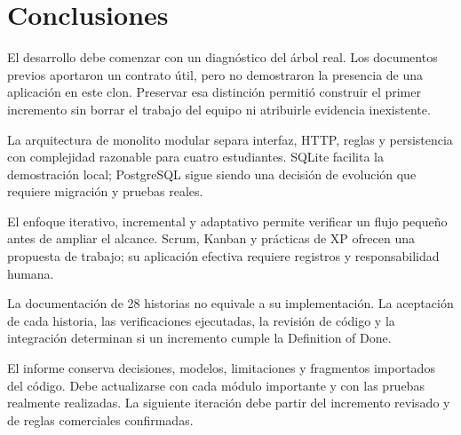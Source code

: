 \chapter{Conclusiones}
El desarrollo debe comenzar con un diagnóstico del árbol real. Los documentos previos aportaron un contrato útil, pero no demostraron la presencia de una aplicación en este clon. Preservar esa distinción permitió construir el primer incremento sin borrar el trabajo del equipo ni atribuirle evidencia inexistente.

La arquitectura de monolito modular separa interfaz, HTTP, reglas y persistencia con complejidad razonable para cuatro estudiantes. SQLite facilita la demostración local; PostgreSQL sigue siendo una decisión de evolución que requiere migración y pruebas reales.

El enfoque iterativo, incremental y adaptativo permite verificar un flujo pequeño antes de ampliar el alcance. Scrum, Kanban y prácticas de XP ofrecen una propuesta de trabajo; su aplicación efectiva requiere registros y responsabilidad humana.

La documentación de 28 historias no equivale a su implementación. La aceptación de cada historia, las verificaciones ejecutadas, la revisión de código y la integración determinan si un incremento cumple la Definition of Done.

El informe conserva decisiones, modelos, limitaciones y fragmentos importados del código. Debe actualizarse con cada módulo importante y con las pruebas realmente realizadas. La siguiente iteración debe partir del incremento revisado y de reglas comerciales confirmadas.
